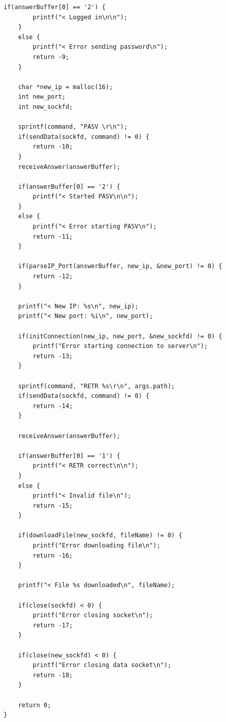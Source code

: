 \documentclass[11pt]{article}
\begin{document}
\begin{lstlisting}[style=CStyle]
    if(answerBuffer[0] == '2') {
        printf("< Logged in\n\n");
    }
    else {
        printf("< Error sending password\n");
        return -9;
    }

    char *new_ip = malloc(16);
    int new_port;
    int new_sockfd;

    sprintf(command, "PASV \r\n");
    if(sendData(sockfd, command) != 0) {
        return -10;
    }
    receiveAnswer(answerBuffer);

    if(answerBuffer[0] == '2') {
        printf("< Started PASV\n\n");
    }
    else {
        printf("< Error starting PASV\n");
        return -11;
    }

    if(parseIP_Port(answerBuffer, new_ip, &new_port) != 0) {
        return -12;
    }

    printf("< New IP: %s\n", new_ip);
    printf("< New port: %i\n", new_port);

    if(initConnection(new_ip, new_port, &new_sockfd) != 0) {
        printf("Error starting connection to server\n");
        return -13;
    }

    sprintf(command, "RETR %s\r\n", args.path);
    if(sendData(sockfd, command) != 0) {
        return -14;
    }

    receiveAnswer(answerBuffer);

    if(answerBuffer[0] == '1') {
        printf("< RETR correct\n\n");
    }
    else {
        printf("< Invalid file\n");
        return -15;
    }

    if(downloadFile(new_sockfd, fileName) != 0) {
        printf("Error downloading file\n");
        return -16;
    }

    printf("< File %s downloaded\n", fileName);

    if(close(sockfd) < 0) {
        printf("Error closing socket\n");
        return -17;
    }

    if(close(new_sockfd) < 0) {
        printf("Error closing data socket\n");
        return -18;
    }

    return 0;
}

\end{lstlisting}
\end{document}
